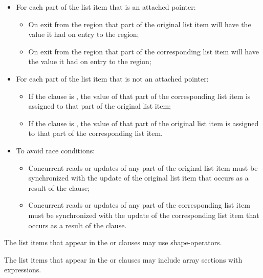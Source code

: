 \begin{itemize}
\item For each part of the list item that is an attached pointer:  

\begin{itemize}
\item On exit from the region that part of the original list item will
      have the value it had on entry to the region;
\item On exit from the region that part of the corresponding list item will
      have the value it had on entry to the region;
\end{itemize}

\item For each part of the list item that is not an attached pointer: 

\begin{itemize}
\item If the clause is , the value of that part of the corresponding 
      list item is assigned to that part of the original list item;
\item If the clause is , the value of that part of the original list 
      item is assigned to that part of the corresponding list item.
\end{itemize}

\item To avoid race conditions: 

\begin{itemize}
\item Concurrent reads or updates of any part of the original list item must be 
      synchronized with the update of the original list item that occurs as a 
      result of the  clause;
\item Concurrent reads or updates of any part of the corresponding list item must 
      be synchronized with the update of the corresponding list item that occurs 
      as a result of the  clause.
\end{itemize}

\end{itemize}


\begin{ccppspecific}
The list items that appear in the  or  clauses may
use shape-operators.
\end{ccppspecific}

The list items that appear in the  or  clauses may
include array sections with  expressions.


